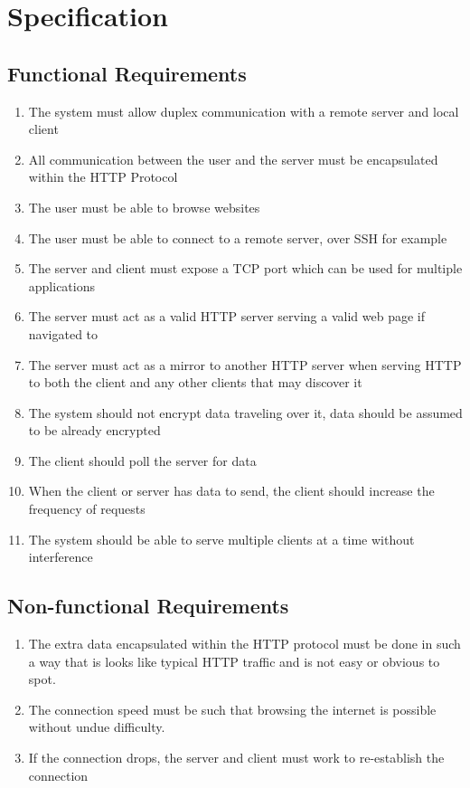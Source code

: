 \section{Specification}
\subsection{Functional Requirements}
\begin{enumerate}
    \item The system must allow duplex communication with a remote server and local client
    \item All communication between the user and the server must be encapsulated within the HTTP Protocol
    \item The user must be able to browse websites
    \item The user must be able to connect to a remote server, over SSH for example
    \item The server and client must expose a TCP port which can be used for multiple applications
    \item The server must act as a valid HTTP server serving a valid web page if navigated to
    \item The server must act as a mirror to another HTTP server when serving HTTP to both the client and any other clients that may discover it
    \item The system should not encrypt data traveling over it, data should be assumed to be already encrypted
    \item The client should poll the server for data
    \item When the client or server has data to send, the client should increase the frequency of requests
    \item The system should be able to serve multiple clients at a time without interference
\end{enumerate}
\subsection{Non-functional Requirements}
\begin{enumerate}
    \item The extra data encapsulated within the HTTP protocol must be done in such a way that is looks like typical HTTP traffic and is not easy or obvious to spot.
    \item The connection speed must be such that browsing the internet is possible without undue difficulty.
    \item If the connection drops, the server and client must work to re-establish the connection
\end{enumerate}
